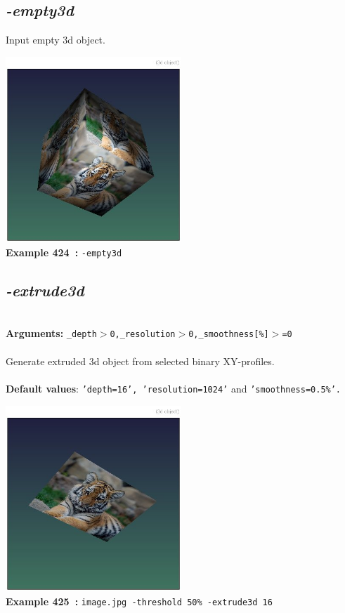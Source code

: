 \documentclass[a4paper,11pt,twoside]{book}
\begin{document}
\subsection{\emph{-empty3d} }\vspace*{-0.5em}
Input empty 3d object.
\begin{center}\includegraphics[keepaspectratio=true,height=7cm,width=\textwidth]{img/gmic_def424.jpg}\\
{\footnotesize \textbf{Example 424~:} \texttt{-empty3d}}
\end{center}

\subsection{\emph{-extrude3d} }\vspace*{-0.5em}
~\\\textbf{Arguments: } 
{\small \texttt{\_depth$>$0,\_resolution$>$0,\_smoothness[\%]$>$=0}}\\~\\
Generate extruded 3d object from selected binary XY-profiles.
~\\~\\\textbf{Default values}: {\small \texttt{'depth=16', 'resolution=1024'} and \texttt{'smoothness=0.5\%'.}}
\begin{center}\includegraphics[keepaspectratio=true,height=7cm,width=\textwidth]{img/gmic_def425.jpg}\\
{\footnotesize \textbf{Example 425~:} \texttt{image.jpg -threshold 50\% -extrude3d 16}}
\end{center}
\end{document}
